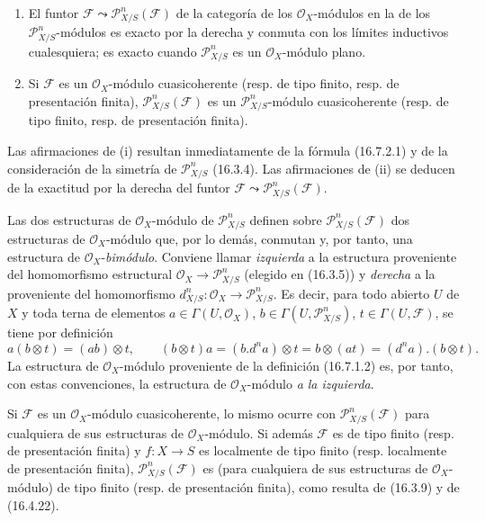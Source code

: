 \begin{proposition}[16.7.3]
\label{IV.16.7.3}
\begin{enumerate}
\item[\textup{(i)}] El funtor
$\mathscr{F}\leadsto\mathscr{P}_{X/S}^n(\mathscr{F})$ de la categoría de los
$\mathcal{O}_X$-módulos en la de los $\mathscr{P}_{X/S}^n$-módulos es
exacto por la derecha y conmuta con los límites inductivos cualesquiera; es exacto
cuando $\mathscr{P}_{X/S}^n$ es un $\mathcal{O}_X$-módulo plano.
\item[\textup{(ii)}] Si $\mathscr{F}$ es un $\mathcal{O}_X$-módulo cuasicoherente
\textup{(resp.} de tipo finito, \textup{resp.} de presentación finita\textup{)},
$\mathscr{P}_{X/S}^n(\mathscr{F})$ es un $\mathscr{P}_{X/S}^n$-módulo
cuasicoherente \textup{(resp.} de tipo finito, \textup{resp.} de presentación finita\textup{)}.
\end{enumerate}
\end{proposition}

Las afirmaciones de (i) resultan inmediatamente de la fórmula (16.7.2.1) y de la
consideración de la simetría de $\mathscr{P}_{X/S}^n$ (16.3.4). Las afirmaciones
de (ii) se deducen de la exactitud por la derecha del funtor
$\mathscr{F}\leadsto\mathscr{P}_{X/S}^n(\mathscr{F})$.

\begin{env}[16.7.4]
\label{IV.16.7.4}
Las dos estructuras de $\mathcal{O}_X$-módulo de $\mathscr{P}_{X/S}^n$
definen sobre $\mathscr{P}_{X/S}^n(\mathscr{F})$ dos estructuras de
$\mathcal{O}_X$-módulo que, por lo demás, conmutan y, por tanto, una estructura de
$\mathcal{O}_X$-\emph{bimódulo}. Conviene llamar \emph{izquierda} a la estructura
proveniente del homomorfismo estructural
$\mathcal{O}_X\to\mathscr{P}_{X/S}^n$ (elegido en (16.3.5)) y
\emph{derecha} a la proveniente del homomorfismo
$d_{X/S}^n:\mathcal{O}_X\to\mathscr{P}_{X/S}^n$. Es decir, para todo
abierto $U$ de $X$ y toda terna de elementos
$a\in\Gamma(U,\mathcal{O}_X)$, $b\in\Gamma(U,\mathscr{P}_{X/S}^n)$,
$t\in\Gamma(U,\mathscr{F})$, se tiene por definición
\[
  a(b\otimes t)=(ab)\otimes t,\qquad
  (b\otimes t)a=(b.d^na)\otimes t=b\otimes(at)
  =(d^na).(b\otimes t).
  \tag{16.7.4.1}
  \label{IV.16.7.4.1}
\]
La estructura de $\mathcal{O}_X$-módulo proveniente de la definición (16.7.1.2)
es, por tanto, con estas convenciones, la estructura de $\mathcal{O}_X$-módulo \emph{a la
izquierda}.

Si $\mathscr{F}$ es un $\mathcal{O}_X$-módulo cuasicoherente, lo mismo ocurre
con $\mathscr{P}_{X/S}^n(\mathscr{F})$ para cualquiera de sus
estructuras de $\mathcal{O}_X$-módulo. Si además $\mathscr{F}$ es de tipo
finito (resp. de presentación finita) y $f:X\to S$ es localmente de tipo finito
(resp. localmente de presentación finita),
$\mathscr{P}_{X/S}^n(\mathscr{F})$ es (para cualquiera de sus
estructuras de $\mathcal{O}_X$-módulo) de tipo finito (resp. de presentación
finita), como resulta de (16.3.9) y de (16.4.22).
\end{env}

